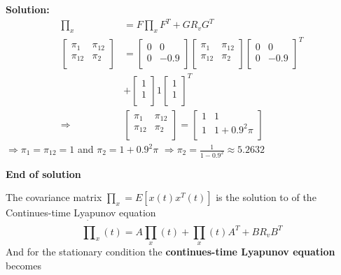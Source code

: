 \begin{multicols}{2}
\textbf{Solution:}
\begin{align*}
    \prod_x &= F\prod_xF^T + GR_vG^T \\
    \begin{bmatrix} 
        \pi_1 & \pi_{12} \\
        \pi_{12} & \pi_2 \\
    \end{bmatrix} &=
    \begin{bmatrix} 
        0 & 0 \\
        0 & -0.9 \\
    \end{bmatrix}
    \begin{bmatrix} 
        \pi_1 & \pi_{12} \\
        \pi_{12} & \pi_2 \\
    \end{bmatrix}
    \begin{bmatrix} 
        0 & 0 \\
        0 & -0.9 \\
    \end{bmatrix}^T \\
    &+ 
    \begin{bmatrix} 
        1 \\
        1 \\
    \end{bmatrix} 1
    \begin{bmatrix} 
        1 \\
        1 \\
    \end{bmatrix}^T \\
    \Rightarrow 
    &\begin{bmatrix} 
        \pi_1 & \pi_{12} \\
        \pi_{12} & \pi_2 \\
    \end{bmatrix} =
    \begin{bmatrix} 
        1 & 1 \\
        1 & 1+0.9^2\pi \\
    \end{bmatrix}
\end{align*}
$\Rightarrow \pi_1=\pi_{12}=1$ and $\pi_2=1+0.9^2\pi$
$\Rightarrow \pi_2=\frac{1}{1-0.9^2}\approx5.2632$

\textbf{End of solution}


The covariance matrix $\prod_x = E[x(t)x^T(t)]$ is the solution to of the\newline
Continues-time Lyapunov equation
\begin{equation*}
    \dot{\prod}_x(t) = A\prod_x(t) + \prod_x(t)A^T + BR_vB^T
\end{equation*}
And for the stationary condition the \textbf{continues-time Lyapunov equation} becomes



\end{multicols}
